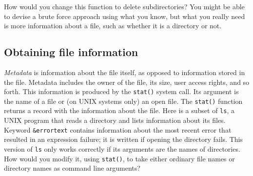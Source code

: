 
How would you change this function to delete subdirectories? You might
be able to devise a brute force approach using what you know, but what
you really need is more information about a file, such as whether it is
a directory or not.

\subsection*{Obtaining file information}

\textit{Metadata} is information about the file
itself, as opposed to information stored in the file. Metadata includes
the owner of the file, its size, user access rights,
and so forth. This information is produced by the
\texttt{stat()} system call. Its argument is the name of
a file or (on UNIX systems only) an open file. The \texttt{stat()}
function returns a record with the information about the file. Here is
a subset of \texttt{ls}, a UNIX program that reads a directory and
lists information about its files. Keyword \texttt{\&errortext} contains information about the
most recent error that resulted in an expression
failure; it is written if opening the directory
fails. This version of \texttt{ls} only works correctly if its
arguments are the names of directories. How would you modify it, using
\texttt{stat()}, to take either ordinary file names or directory names
as command line arguments?

